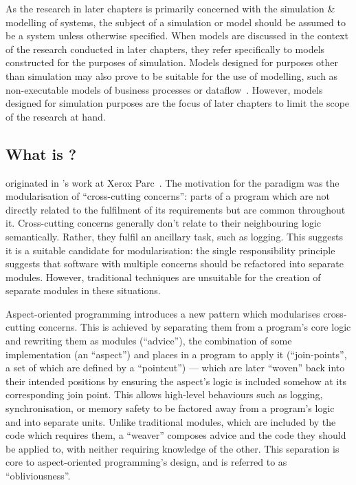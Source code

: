 As the research in later chapters is primarily concerned with the simulation \&
modelling of \sociotechnical systems, the subject of a simulation or model
should be assumed to be a \sociotechnical system unless otherwise specified.
When models are discussed in the context of the research conducted in later
chapters, they refer specifically to models constructed for the purposes of
simulation. Models designed for purposes other than simulation may also prove to
be suitable for the use of \aspectoriented{} modelling, such as non-executable
models of business processes or
dataflow~\cite{obashimethodology,Cappelli_AOBPM,charfi2010AO4BPMN}. However,
models designed for simulation purposes are the focus of later chapters to limit
the scope of the research at hand.




\subsection{What is \AOP{}?}
\label{aop_brief_introduction}

\Aop{} originated in \citeauthor{kiczales1997aspect}'s work
at Xerox Parc~\cite{kiczales1997aspect}. The motivation for the paradigm was the
modularisation of ``cross-cutting concerns'': parts of a program which are not
directly related to the fulfilment of its requirements but are common throughout
it. Cross-cutting concerns generally don't relate to their neighbouring logic
semantically. Rather, they fulfil an ancillary task, such as logging. This
suggests it is a suitable candidate for modularisation: the single
responsibility principle~\cite{martin2003singleresponsibility} suggests that
software with multiple concerns should be refactored into separate modules.
However, traditional techniques are unsuitable for the creation of separate
modules in these situations.

Aspect-oriented programming introduces a new pattern which modularises
cross-cutting concerns. This is achieved by separating them from a program's
core logic and rewriting them as modules (``advice''), the combination of some
implementation (an ``aspect'') and places in a program to apply it
(``join-points'', a set of which are defined by a ``pointcut'') --- which are
later ``woven'' back into their intended positions by ensuring the aspect's
logic is included somehow at its corresponding join point. This allows
high-level behaviours such as logging, synchronisation, or memory safety to be
factored away from a program's logic and into separate units. Unlike traditional
modules, which are included by the code which requires them, a ``weaver''
composes advice and the code they should be applied to, with neither requiring
knowledge of the other. This separation is core to aspect-oriented programming's
design, and is referred to as ``obliviousness''.

